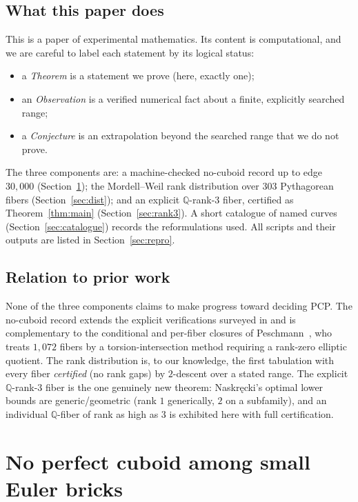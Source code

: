 \documentclass[11pt,reqno]{amsart}
\theoremstyle{plain}
\theoremstyle{definition}
\theoremstyle{remark}
\newcommand{\Q}{\mathbb{Q}}
\begin{document}
\subsection*{What this paper does}
This is a paper of experimental mathematics. Its content is computational, and
we are careful to label each statement by its logical status:
\begin{itemize}
  \item a \emph{Theorem} is a statement we prove (here, exactly one);
  \item an \emph{Observation} is a verified numerical fact about a finite,
        explicitly searched range;
  \item a \emph{Conjecture} is an extrapolation beyond the searched range that
        we do not prove.
\end{itemize}
The three components are: a machine-checked no-cuboid record up to edge
$30{,}000$ (Section~\ref{sec:bricks}); the Mordell--Weil rank distribution over
$303$ Pythagorean fibers (Section~\ref{sec:dist}); and an explicit
$\Q$-rank-$3$ fiber, certified as Theorem~\ref{thm:main}
(Section~\ref{sec:rank3}). A short catalogue of named curves
(Section~\ref{sec:catalogue}) records the reformulations used. All scripts and
their outputs are listed in Section~\ref{sec:repro}.

\subsection*{Relation to prior work}
None of the three components claims to make progress toward deciding PCP. The
no-cuboid record extends the explicit verifications surveyed in
\cite{vanLuijk,Sharipov} and is complementary to the conditional and per-fiber
closures of Peschmann~\cite{Pesch1,Pesch2}, who treats $1{,}072$ fibers by a
torsion-intersection method requiring a rank-zero elliptic quotient. The rank
distribution is, to our knowledge, the first tabulation with every fiber
\emph{certified} (no rank gaps) by $2$-descent over a stated range. The
explicit $\Q$-rank-$3$ fiber is the one genuinely new theorem: Naskr\k{e}cki's
optimal lower bounds are generic/geometric (rank $1$ generically, $2$ on a
subfamily), and an individual $\Q$-fiber of rank as high as $3$ is exhibited
here with full certification.

\section{No perfect cuboid among small Euler bricks}\label{sec:bricks}
\end{document}
